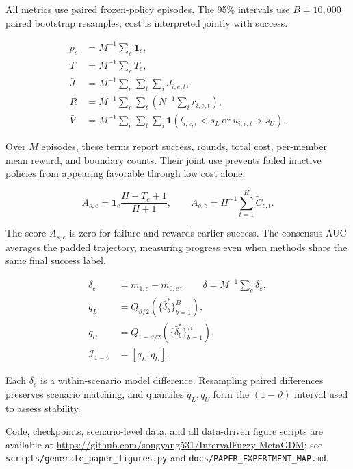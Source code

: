 \documentclass[journal]{IEEEtran}
\newcommand{\eqnote}[1]{\par\vspace{-0.3ex}\noindent #1\par\vspace{0.4ex}}
\begin{document}
All metrics use paired frozen-policy episodes. The 95\% intervals use $B=10{,}000$ paired bootstrap resamples; cost is interpreted jointly with success.

\begin{equation}
\begin{aligned}
p_s&=M^{-1}\sum_e\mathbf{1}_e,\\
\bar T&=M^{-1}\sum_eT_e,\\
\bar J&=M^{-1}\sum_e\sum_t\sum_iJ_{i,e,t},\\
\bar R&=M^{-1}\sum_e\sum_t\left(N^{-1}\sum_ir_{i,e,t}\right),\\
\bar V&=M^{-1}\sum_e\sum_t\sum_i
\mathbf{1}(l_{i,e,t}<s_L\ \text{or}\ u_{i,e,t}>s_U).
\end{aligned}
\label{eq:metrics}
\end{equation}

\eqnote{Over $M$ episodes, these terms report success, rounds, total cost, per-member mean reward, and boundary counts. Their joint use prevents failed inactive policies from appearing favorable through low cost alone.}

\begin{equation}
A_{s,e}=\mathbf{1}_e\frac{H-T_e+1}{H+1},\qquad
A_{c,e}=H^{-1}\sum_{t=1}^{H}\widetilde C_{e,t}.
\label{eq:auc}
\end{equation}

\eqnote{The score $A_{s,e}$ is zero for failure and rewards earlier success. The consensus AUC averages the padded trajectory, measuring progress even when methods share the same final success label.}

\begin{equation}
\begin{aligned}
\delta_e&=m_{1,e}-m_{0,e},\qquad
\bar\delta=M^{-1}\sum_e\delta_e,\\
q_L&=Q_{\vartheta/2}(\{\bar\delta_b^*\}_{b=1}^{B}),\\
q_U&=Q_{1-\vartheta/2}(\{\bar\delta_b^*\}_{b=1}^{B}),\\
\mathcal I_{1-\vartheta}&=[q_L,q_U].
\end{aligned}
\label{eq:bootstrap}
\end{equation}

\eqnote{Each $\delta_e$ is a within-scenario model difference. Resampling paired differences preserves scenario matching, and quantiles $q_L,q_U$ form the $(1-\vartheta)$ interval used to assess stability.}

Code, checkpoints, scenario-level data, and all data-driven figure scripts are available at \url{https://github.com/songyang531/IntervalFuzzy-MetaGDM}; see \texttt{scripts/generate\_paper\_figures.py} and \texttt{docs/PAPER\_EXPERIMENT\_MAP.md}.
\end{document}
